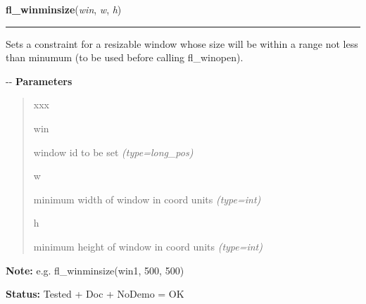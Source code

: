 \hspace{.8\funcindent}\begin{boxedminipage}{\funcwidth}

    \raggedright \textbf{fl\_winminsize}(\textit{win}, \textit{w}, \textit{h})

    \vspace{-1.5ex}

    \rule{\textwidth}{0.5\fboxrule}
\setlength{\parskip}{2ex}

Sets a constraint for a resizable window whose size will be within a
range not less than minumum (to be used before calling fl\_winopen).

-{}-
\setlength{\parskip}{1ex}
      \textbf{Parameters}
      \vspace{-1ex}

      \begin{quote}
        \begin{Ventry}{xxx}

          \item[win]


window id to be set
            {\it (type=long\_pos)}

          \item[w]


minimum width of window in coord units
            {\it (type=int)}

          \item[h]


minimum height of window in coord units
            {\it (type=int)}

        \end{Ventry}

      \end{quote}

\textbf{Note:} 
e.g. fl\_winminsize(win1, 500, 500)


\textbf{Status:} 
Tested + Doc + NoDemo = OK


    \end{boxedminipage}

    \label{xformslib:flxbasic:fl_winmaxsize}

    \vspace{0.5ex}

